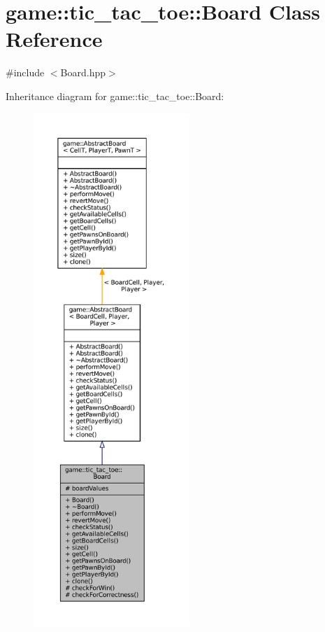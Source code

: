 \hypertarget{classgame_1_1tic__tac__toe_1_1_board}{}\section{game\+:\+:tic\+\_\+tac\+\_\+toe\+:\+:Board Class Reference}
\label{classgame_1_1tic__tac__toe_1_1_board}


{\ttfamily \#include $<$Board.\+hpp$>$}



Inheritance diagram for game\+:\+:tic\+\_\+tac\+\_\+toe\+:\+:Board\+:
\nopagebreak
\begin{figure}[H]
\begin{center}
\leavevmode
\includegraphics[height=550pt]{classgame_1_1tic__tac__toe_1_1_board__inherit__graph}
\end{center}
\end{figure}



